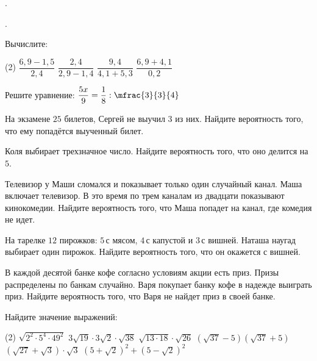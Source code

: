 \begin{class}[number=5]
	\begin{listofex}
		\item .
	\end{listofex}
\end{class}

\begin{class}[number=6]
	\begin{listofex}
		\item .
	\end{listofex}
\end{class}

\begin{homework}[number=3]
	\begin{listofex}
		\item Вычислите:
		\begin{tasks}(2)
			\task \( \dfrac{6,9-1,5}{2,4} \)
			\task \( \dfrac{2,4}{2,9-1,4} \)
			\task \( \dfrac{9,4}{4,1+5,3} \)
			\task \( \dfrac{6,9+4,1}{0,2} \)
		\end{tasks}
		\item Решите уравнение: \( \dfrac{5x}{9}=\dfrac{1}{8}:\mfrac{3}{3}{4} \)
		\item На экзамене \( 25 \) билетов, Сергей не выучил \( 3 \) из них. Найдите вероятность того, что ему попадётся выученный билет.
		\item Коля выбирает трехзначное число. Найдите вероятность того, что оно делится на \( 5 \).
		\item Телевизор у Маши сломался и показывает только один случайный канал. Маша включает телевизор. В это время по трем каналам из двадцати показывают кинокомедии. Найдите вероятность того, что Маша попадет на канал, где комедия не идет.
		\item На тарелке \( 12 \) пирожков: \( 5 \) с мясом, \( 4 \) с капустой и \( 3 \) с вишней. Наташа наугад выбирает один пирожок. Найдите вероятность того, что он окажется с вишней.
		\item В каждой десятой банке кофе согласно условиям акции есть приз. Призы распределены по банкам случайно. Варя покупает банку кофе в надежде выиграть приз. Найдите вероятность того, что Варя не найдет приз в своей банке.
		\item Найдите значение выражений:
		\begin{tasks}(2)
			\task \( \sqrt{2^2\cdot5^4\cdot49^2} \)
			\task \( 3\sqrt{19}\cdot3\sqrt{2}\cdot\sqrt{38} \)
			\task \( \sqrt{13\cdot18}\cdot\sqrt{26} \)
			\task \( (\sqrt{37}-5)(\sqrt{37}+5) \)
			\task \( (\sqrt{27}+\sqrt{3})\cdot\sqrt{3} \)
			\task \( (5+\sqrt{2})^2+(5-\sqrt{2})^2 \)
		\end{tasks}
	\end{listofex}
\end{homework}

